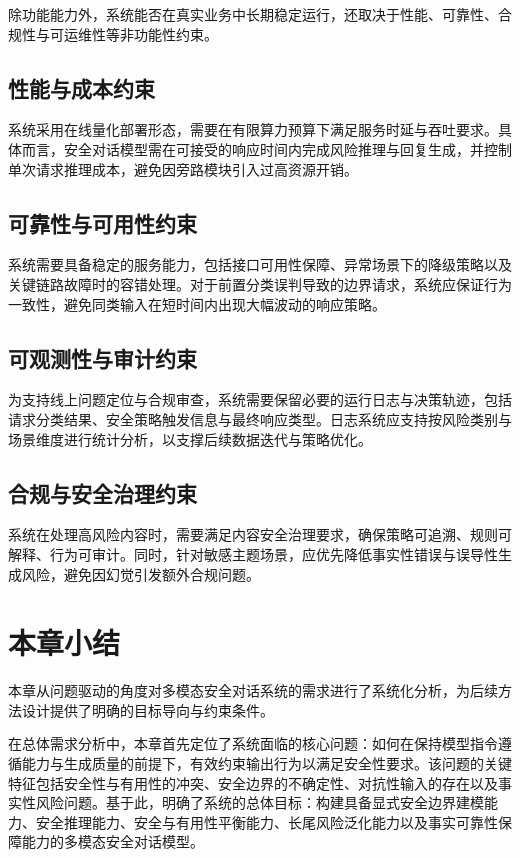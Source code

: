 除功能能力外，系统能否在真实业务中长期稳定运行，还取决于性能、可靠性、合规性与可运维性等非功能性约束。

\subsection{性能与成本约束}

系统采用在线量化部署形态，需要在有限算力预算下满足服务时延与吞吐要求。具体而言，安全对话模型需在可接受的响应时间内完成风险推理与回复生成，并控制单次请求推理成本，避免因旁路模块引入过高资源开销。

\subsection{可靠性与可用性约束}

系统需要具备稳定的服务能力，包括接口可用性保障、异常场景下的降级策略以及关键链路故障时的容错处理。对于前置分类误判导致的边界请求，系统应保证行为一致性，避免同类输入在短时间内出现大幅波动的响应策略。

\subsection{可观测性与审计约束}

为支持线上问题定位与合规审查，系统需要保留必要的运行日志与决策轨迹，包括请求分类结果、安全策略触发信息与最终响应类型。日志系统应支持按风险类别与场景维度进行统计分析，以支撑后续数据迭代与策略优化。

\subsection{合规与安全治理约束}

系统在处理高风险内容时，需要满足内容安全治理要求，确保策略可追溯、规则可解释、行为可审计。同时，针对敏感主题场景，应优先降低事实性错误与误导性生成风险，避免因幻觉引发额外合规问题。

\section{本章小结}

本章从问题驱动的角度对多模态安全对话系统的需求进行了系统化分析，为后续方法设计提供了明确的目标导向与约束条件。

在总体需求分析中，本章首先定位了系统面临的核心问题：如何在保持模型指令遵循能力与生成质量的前提下，有效约束输出行为以满足安全性要求。该问题的关键特征包括安全性与有用性的冲突、安全边界的不确定性、对抗性输入的存在以及事实性风险问题。基于此，明确了系统的总体目标：构建具备显式安全边界建模能力、安全推理能力、安全与有用性平衡能力、长尾风险泛化能力以及事实可靠性保障能力的多模态安全对话模型。

